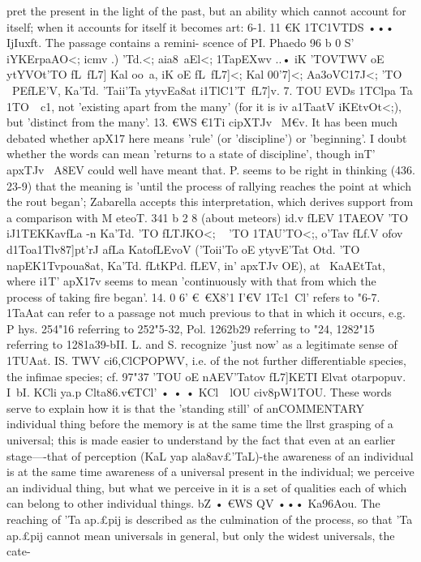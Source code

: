 {{{{{{{{{{{{{{{{{{{{{{{{{{{{{{{{{{{{{{{{{{{{{{{{{{{{{{{{{{{{{{{{{{{{{pret the present in the light of the past, but an ability which
cannot account for itself; when it accounts for itself it becomes
art:
6-1. 11 €K 1TC1VTDS ••• IjIuxft. The passage contains a remini-
scence of PI. Phaedo 96 b 0 S' iYKErpaAO<; icmv .) 'Td.<; aia8~aEl<;
1TapEXwv ..• iK 'TOVTWV oE ytYVOt'TO fL~fL7] Kal oo~a, iK oE fL~fL7]<; Kal
00'7]<; Aa{3oVC17J<; 'TO ~PEfLE'V, Ka'Td. 'Taii'Ta ytyvEa8at i1TlC1'T~fL7]v.
7. TOU EVDs 1TClpa Ta 1TO~~c1, not 'existing apart from the
many' (for it is iv a1TaatV iKEtvOt<;), but 'distinct from the many'.
13. €WS €1Ti cipXTJv ~M€v. It has been much debated whether
apX17 here means 'rule' (or 'discipline') or 'beginning'. I doubt
whether the words can mean 'returns to a state of discipline',
though inT' apxTJv ~A8EV could well have meant that. P. seems to
be right in thinking (436. 23-9) that the meaning is 'until the
process of rallying reaches the point at which the rout began';
Zabarella accepts this interpretation, which derives support from
a comparison with M eteoT. 341 b 2 8 (about meteors) id.v fLEV 1TAEOV 'TO
iJ1TEKKavfLa -n Ka'Td. 'TO fLTJKO<; ~ 'TO 1TAU'TO<;, o'Tav fLf.V ofov d1Toa1Tlv87]pt'rJ
afLa KatofLEvoV ('Toii'To oE ytyvE'Tat Otd. 'TO napEK1Tvpoua8at, Ka'Td. fLtKPd.
fLEV, in' apxTJv OE), at~ KaAEtTat, where i1T' apX17v seems to mean
'continuously with that from which the process of taking fire
began'.
14. 0 6' €~€X8'1 I'€V 1Tc1~Cl' refers to "6-7. 1TaAat can refer to
a passage not much previous to that in which it occurs, e.g. P hys.
254"16 referring to 252"5-32, Pol. 1262b29 referring to "24, 1282"15
referring to 1281a39-bII. L. and S. recognize 'just now' as a
legitimate sense of 1TUAat.
IS. TWV ci6,ClCPOPWV, i.e. of the not further differentiable species,
the infimae species; cf. 97"37 'TOU oE nAEV'Tatov fL7]KETI Elvat otarpopuv.
I~bI. KCli ya.p Clta86.v€TCl' • • • KCl~~lOU civ8pW1TOU.
These
words serve to explain how it is that the 'standing still' of anCOMMENTARY
individual thing before the memory is at the same time the llrst
grasping of a universal; this is made easier to understand by the
fact that even at an earlier stage----that of perception (KaL yap
ala8av£'TaL)-the awareness of an individual is at the same time
awareness of a universal present in the individual; we perceive an
individual thing, but what we perceive in it is a set of qualities
each of which can belong to other individual things.
bZ • €WS QV ••• Ka96Aou. The reaching of 'Ta ap.£pij is described
as the culmination of the process, so that 'Ta ap.£pij cannot mean
universals in general, but only the widest universals, the cate-
}}}}}}}}}}}}}}}}}}}}}}}}}}}}}}}}}}}}}}}}}}}}}}}}}}}}}}}}}}}}}}}}}}}}}}
